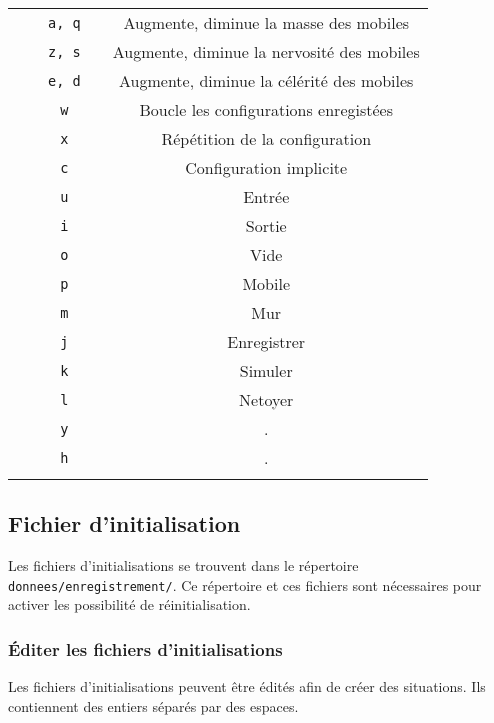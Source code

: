 \begin{center}
\begin{tabular}{ccccc}
 &  & \texttt{a, q} &  & Augmente, diminue la masse des mobiles \\
 &  & \texttt{z, s} &  & Augmente, diminue la nervosité des mobiles \\
 &  & \texttt{e, d} &  & Augmente, diminue la célérité des mobiles \\

 &  & \texttt{w} &  & Boucle les configurations enregistées  \\
 &  & \texttt{x} &  & Répétition de la configuration \\
 &  & \texttt{c} &  & Configuration implicite \\

 &  & \texttt{u} &  & Entrée  \\
 &  & \texttt{i} &  & Sortie \\
 &  & \texttt{o} &  & Vide \\
 &  & \texttt{p} &  & Mobile \\
 &  & \texttt{m} &  & Mur \\

 &  & \texttt{j} &  & Enregistrer  \\
 &  & \texttt{k} &  & Simuler \\
 &  & \texttt{l} &  & Netoyer \\

 &  & \texttt{y} &  & . \\
 &  & \texttt{h} &  & . \\
\\
\end{tabular}
\end{center}
%
\subsection{Fichier d'initialisation}
%
Les fichiers d'initialisations se trouvent dans le répertoire \texttt{donnees/enregistrement/}. Ce répertoire et ces fichiers sont nécessaires pour activer les possibilité de réinitialisation.
%
\subsubsection{Éditer les fichiers d'initialisations}
Les fichiers d'initialisations peuvent être édités afin de créer des situations. Ils contiennent des entiers séparés par des espaces.


